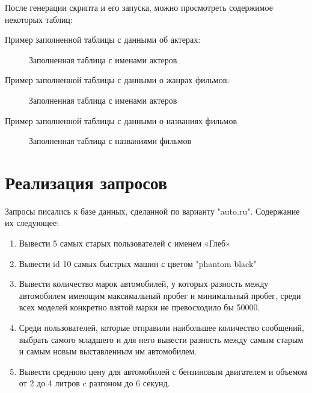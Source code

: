 После генерации скрипта и его запуска, можно просмотреть содержимое некоторых таблиц:

Пример заполненной таблицы с данными об актерах:
\begin{figure} [H]
    \center{\texttt{[image: ex1]}}
    \caption{Заполненная таблица с именами актеров}
\end{figure}

Пример заполненной таблицы с данными о жанрах фильмов:
\begin{figure} [H]
    \caption{Заполненная таблица с именами актеров}
\end{figure}

Пример заполненной таблицы с данными о названиях фильмов
\begin{figure}
    \caption{Заполненная таблица с названиями фильмов}
\end{figure}

\section{Реализация запросов}
Запросы писались к базе данных, сделанной по варианту "auto.ru". Содержание их следующее:
\begin{enumerate}
\item Вывести 5 самых старых пользователей с именем «Глеб»
\item Вывести id 10 самых быстрых машин с цветом "phantom black"
\item Вывести количество марок автомобилей, у которых разность между 
автомобилем имеющим максимальный пробег и минимальный пробег, среди всех 
моделей конкретно взятой марки не превосходило бы 50000.
\item Среди пользователей, которые отправили наибольшее количество сообщений, 
выбрать самого младшего и для него вывести разность между самым старым и самым 
новым выставленным им автомобилем.
\item Вывести среднюю цену для автомобилей с бензиновым двигателем и объемом от 2 до 4 литров c разгоном до 6 секунд.
\end{enumerate}



